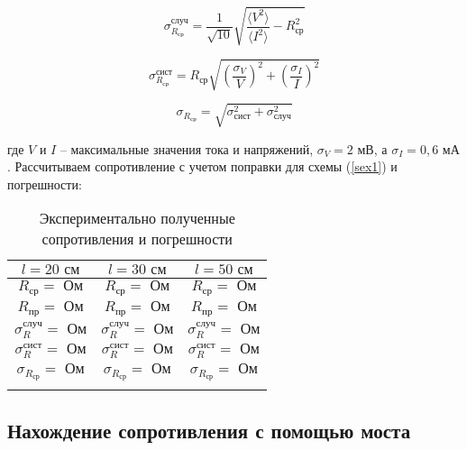 	
	\begin{minipage}{0.45\textwidth}
		\centering
		\begin{equation}
			\sigma_{R_\text{ср}}^{\text{случ}} = \frac{1}{\sqrt{10}}\sqrt{\frac{\langle V^2 \rangle}{\langle I^2 \rangle} - R_\text{ср}^2}
		\end{equation}
	\end{minipage}
	\begin{minipage}{0.45\textwidth}
		\centering
		
		\begin{equation}
			\sigma_{R_\text{ср}}^{\text{сист}} = R_\text{ср}\sqrt{\left(\frac{\sigma_V}{V} \right)^2 + \left(\frac{\sigma_I}{I} \right)^2}
		\end{equation}
	\end{minipage}
	
	\begin{equation}
		\sigma_{R_\text{ср}} = \sqrt{\sigma_{\text{сист}}^2 + \sigma_{\text{случ}}^2}
	\end{equation}
	
	\noindent где $V$ и $I$ -- максимальные значения тока и напряжений, $\sigma_V = 2 \text{ мВ}$, а $\sigma_I = 0,6 \text{ мА}$. Рассчитываем сопротивление с учетом поправки для схемы (\ref{sex1}) и погрешности:
	
	\begin{longtable}[H]{|c||c||c|}
		\hline
		$l = 20 \text{ см}$ & $l = 30 \text{ см}$ & $l = 50 \text{ см}$ \\
		\hline
		$R_\text{ср} =  \text{ Ом}$ & $R_\text{ср} =  \text{ Ом}$ & $R_\text{ср} =  \text{ Ом}$ \\
		\hline
		$R_\text{пр} =  \text{ Ом}$ & $R_\text{пр} =  \text{ Ом}$ & $R_\text{пр} =  \text{ Ом}$\\
		\hline
		$\sigma_R^\text{случ} = \text{ Ом}$ & $\sigma_R^\text{случ} = \text{ Ом}$ & $\sigma_R^\text{случ} = \text{ Ом}$ \\
		\hline
		$\sigma_R^\text{сист} =  \text{ Ом}$ & $\sigma_R^\text{сист} =  \text{ Ом}$ & $\sigma_R^\text{сист} =  \text{ Ом}$ \\
		\hline
		$\sigma_{R_\text{ср}} =  \text{ Ом}$ & $\sigma_{R_\text{ср}} =  \text{ Ом}$ & $\sigma_{R_\text{ср}} =  \text{ Ом}$ \\
		\hline
		
		\caption{Экспериментально полученные сопротивления и погрешности}
		\label{R}
	\end{longtable}
	
	\subsection{Нахождение сопротивления с помощью моста}
	
